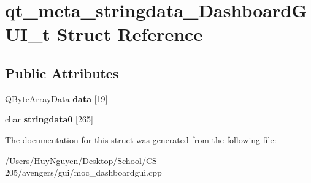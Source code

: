 \hypertarget{structqt__meta__stringdata__DashboardGUI__t}{}\section{qt\+\_\+meta\+\_\+stringdata\+\_\+\+Dashboard\+G\+U\+I\+\_\+t Struct Reference}
\label{structqt__meta__stringdata__DashboardGUI__t}
\subsection*{Public Attributes}
\begin{DoxyCompactItemize}
\item 
Q\+Byte\+Array\+Data {\bfseries data} \mbox{[}19\mbox{]}\hypertarget{structqt__meta__stringdata__DashboardGUI__t_ad3ae733cdcf12fbb013232ff8cd8a638}{}\label{structqt__meta__stringdata__DashboardGUI__t_ad3ae733cdcf12fbb013232ff8cd8a638}

\item 
char {\bfseries stringdata0} \mbox{[}265\mbox{]}\hypertarget{structqt__meta__stringdata__DashboardGUI__t_a7c00ac8d1fcb035c0bf8f2c5ffd770cb}{}\label{structqt__meta__stringdata__DashboardGUI__t_a7c00ac8d1fcb035c0bf8f2c5ffd770cb}

\end{DoxyCompactItemize}


The documentation for this struct was generated from the following file\+:\begin{DoxyCompactItemize}
\item 
/\+Users/\+Huy\+Nguyen/\+Desktop/\+School/\+C\+S 205/avengers/gui/moc\+\_\+dashboardgui.\+cpp\end{DoxyCompactItemize}
